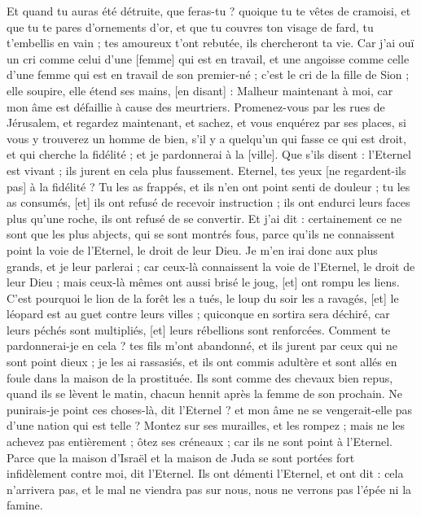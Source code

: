\begin{multicols}{2}
Et quand tu auras été détruite, que feras-tu ? quoique tu te vêtes de cramoisi, et que tu te pares d'ornements d'or, et que tu couvres ton visage de fard, tu t'embellis en vain ; tes amoureux t'ont rebutée, ils chercheront ta vie.
Car j'ai ouï un cri comme celui d'une [femme] qui est en travail, et une angoisse comme celle d'une femme qui est en travail de son premier-né ; c'est le cri de la fille de Sion ; elle soupire, elle étend ses mains, [en disant] : Malheur maintenant à moi, car mon âme est défaillie à cause des meurtriers.
\VerseOne{}Promenez-vous par les rues de Jérusalem, et regardez maintenant, et sachez, et vous enquérez par ses places, si vous y trouverez un homme de bien, s'il y a quelqu'un qui fasse ce qui est droit, et qui cherche la fidélité ; et je pardonnerai à la [ville].
Que s'ils disent : l'Eternel est vivant ; ils jurent en cela plus faussement.
Eternel, tes yeux [ne regardent-ils pas] à la fidélité ? Tu les as frappés, et ils n'en ont point senti de douleur ; tu les as consumés, [et] ils ont refusé de recevoir instruction ; ils ont endurci leurs faces plus qu'une roche, ils ont refusé de se convertir.
Et j'ai dit : certainement ce ne sont que les plus abjects, qui se sont montrés fous, parce qu'ils ne connaissent point la voie de l'Eternel, le droit de leur Dieu.
Je m'en irai donc aux plus grands, et je leur parlerai ; car ceux-là connaissent la voie de l'Eternel, le droit de leur Dieu ; mais ceux-là mêmes ont aussi brisé le joug, [et] ont rompu les liens.
C'est pourquoi le lion de la forêt les a tués, le loup du soir les a ravagés, [et] le léopard est au guet contre leurs villes ; quiconque en sortira sera déchiré, car leurs péchés sont multipliés, [et] leurs rébellions sont renforcées.
Comment te pardonnerai-je en cela ? tes fils m'ont abandonné, et ils jurent par ceux qui ne sont point dieux ; je les ai rassasiés, et ils ont commis adultère et sont allés en foule dans la maison de la prostituée.
Ils sont comme des chevaux bien repus, quand ils se lèvent le matin, chacun hennit après la femme de son prochain.
Ne punirais-je point ces choses-là, dit l'Eternel ? et mon âme ne se vengerait-elle pas d'une nation qui est telle ?
Montez sur ses murailles, et les rompez ; mais ne les achevez pas entièrement ; ôtez ses créneaux ; car ils ne sont point à l'Eternel.
Parce que la maison d'Israël et la maison de Juda se sont portées fort infidèlement contre moi, dit l'Eternel.
Ils ont démenti l'Eternel, et ont dit : cela n'arrivera pas, et le mal ne viendra pas sur nous, nous ne verrons pas l'épée ni la famine.

\end{multicols}
